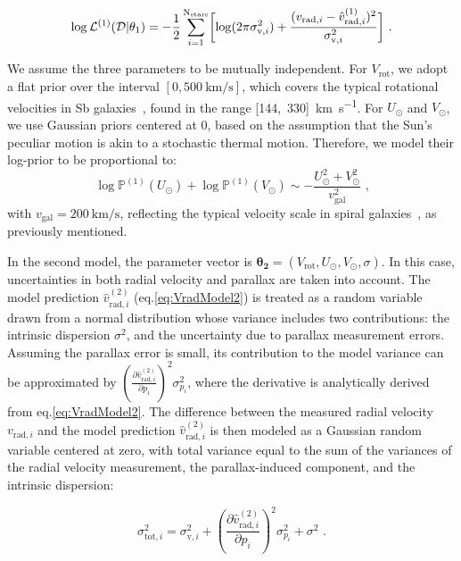 \begin{equation}\label{Eq:LogLikeMod1}
    \log \mathcal{L}^{(1)}(\mathcal{D} \vert \theta_1) = -\frac{1}{2}\sum_{i=1}^{\text{N}_{\text{stars}}}\biggl[\log(2\pi\sigma_{\text{v},i}^2)+\frac{(v_{\text{rad},i} - \hat{v}_{\text{rad},i}^{(1)})^2}{\sigma_{\text{v},i}^2}\biggr] \text{ .}
\end{equation}

We assume the three parameters to be mutually independent. For $V_{\text{rot}}$, we adopt a flat prior over the interval $[0,\qty{500}{\kilo\meter\per\second}]$, which covers the typical rotational velocities in Sb galaxies~\cite{Schneider2015}, found in the range [144,~330]~\unit{\kilo\meter\per\second}\cite{Schneider2015}. For $U_\odot$ and $V_\odot$, we use Gaussian priors centered at 0, based on the assumption that the Sun's peculiar motion is akin to a stochastic thermal motion. Therefore, we model their log-prior to be proportional to:
\begin{equation*}
    \log\mathbb{P}^{(1)}(U_\odot) + \log\mathbb{P}^{(1)}(V_\odot) \sim - \frac{U_\odot^2 + V_{\odot}^2}{v_{\text{gal}}^2} \text{ ,}
\end{equation*}
\noindent
with $v_{\text{gal}} = \qty{200}{\kilo\meter\per\second}$, reflecting the typical velocity scale in spiral galaxies~\cite{Schneider2015}, as previously mentioned.

In the second model, the parameter vector is $\mathbf{\theta_2} = (V_{\text{rot}}, U_{\odot}, V_{\odot}, \sigma)$. In this case, uncertainties in both radial velocity and parallax are taken into account. 
The model prediction \(\hat{v}^{(2)}_{\text{rad}, i}\) (eq.\ref{eq:VradModel2}) is treated as a random variable drawn from a normal distribution whose variance includes two contributions: the intrinsic dispersion \(\sigma^2\), and the uncertainty due to parallax measurement errors.
Assuming the parallax error is small, its contribution to the model variance can be approximated by \(\left( \frac{\partial \hat{v}^{(2)}_{\text{rad}, i}}{\partial p_i} \right)^2 \sigma^2_{p_i}\), where the derivative is analytically derived from eq.\ref{eq:VradModel2}. 
The difference between the measured radial velocity \(v_{\text{rad}, i}\) and the model prediction \(\hat{v}^{(2)}_{\text{rad}, i}\) is then modeled as a Gaussian random variable centered at zero, with total variance equal to the sum of the variances of the radial velocity measurement, the parallax-induced component, and the intrinsic dispersion:

\begin{equation}\label{eq:ErrorPropagation}
    \sigma^2_{\text{tot}, i} = \sigma^2_{\text{v},i} +  {\left( \frac{\partial \hat{v}^{(2)}_{\text{rad}, i}}{\partial p_i} \right)}^2 \sigma^2_{p_i} + \sigma^2 \text{ .}
\end{equation}


